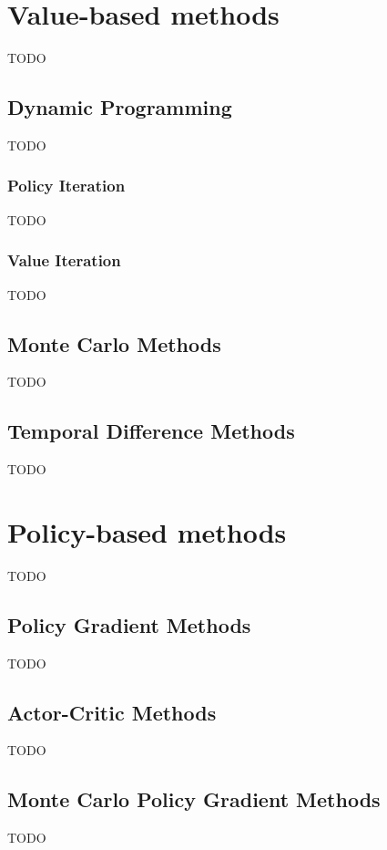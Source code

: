 \documentclass[../chapters.tex]{subfiles}
\begin{document}
    \section{Value-based methods}
    TODO

    \subsection{Dynamic Programming}\label{subsec:dynamic-programming}
    TODO

    \subsubsection{Policy Iteration}\label{subsubsec:policy-iteration}
    TODO

    \subsubsection{Value Iteration}\label{subsubsec:value-iteration}
    TODO

    \subsection{Monte Carlo Methods}\label{subsec:monte-carlo-methods}
    TODO

    \subsection{Temporal Difference Methods}\label{subsec:temporal-difference-methods}
    TODO



    \section{Policy-based methods}
    TODO

    \subsection{Policy Gradient Methods}\label{subsec:policy-gradient-methods}
    TODO

    \subsection{Actor-Critic Methods}\label{subsec:actor-critic-methods}
    TODO

    \subsection{Monte Carlo Policy Gradient Methods}\label{subsec:monte-carlo-policy-gradient-methods}
    TODO
\end{document}
